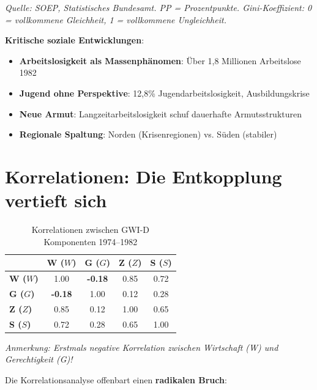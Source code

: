 \begin{flushleft}
\footnotesize{\textit{Quelle: SOEP, Statistisches Bundesamt. PP = Prozentpunkte. Gini-Koeffizient: 0 = vollkommene Gleichheit, 1 = vollkommene Ungleichheit.}}
\end{flushleft}

\textbf{Kritische soziale Entwicklungen}:

\begin{itemize}
    \item \textbf{Arbeitslosigkeit als Massenphänomen}: Über 1,8 Millionen Arbeitslose 1982
    \item \textbf{Jugend ohne Perspektive}: 12,8\% Jugendarbeitslosigkeit, Ausbildungskrise
    \item \textbf{Neue Armut}: Langzeitarbeitslosigkeit schuf dauerhafte Armutsstrukturen
    \item \textbf{Regionale Spaltung}: Norden (Krisenregionen) vs. Süden (stabiler)
\end{itemize}

\section{Korrelationen: Die Entkopplung vertieft sich}

\begin{table}[ht]
    \centering
    \caption{Korrelationen zwischen GWI-D Komponenten 1974–1982}
    \label{tab:korrelation_stagflation}
    \begin{tabular}{lcccc}
        \toprule
        & \textbf{W (\(W\))} & \textbf{G (\(G\))} & \textbf{Z (\(Z\))} & \textbf{S (\(S\))} \\
        \midrule
        \textbf{W (\(W\))} & 1.00 & \textbf{-0.18} & 0.85 & 0.72 \\
        \textbf{G (\(G\))} & \textbf{-0.18} & 1.00 & 0.12 & 0.28 \\
        \textbf{Z (\(Z\))} & 0.85 & 0.12 & 1.00 & 0.65 \\
        \textbf{S (\(S\))} & 0.72 & 0.28 & 0.65 & 1.00 \\
        \bottomrule
    \end{tabular}
\end{table}

\begin{flushleft}
\footnotesize{\textit{Anmerkung: Erstmals negative Korrelation zwischen Wirtschaft (W) und Gerechtigkeit (G)!}}
\end{flushleft}

Die Korrelationsanalyse offenbart einen \textbf{radikalen Bruch}:

